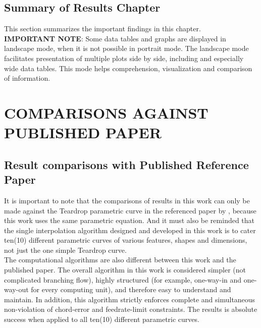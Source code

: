 \subsection{Summary of Results Chapter}
 
This section summarizes the important findings in this chapter.\\

\noindent
\textbf{IMPORTANT NOTE}: Some data tables and graphs are displayed in landscape mode, when it is not possible in portrait mode. The landscape mode facilitates presentation of multiple plots side by side, including and especially wide data tables. This mode helps comprehension, visualization and comparison of information.

\clearpage
\pagebreak

\section{COMPARISONS AGAINST PUBLISHED PAPER}

\subsection{Result comparisons with Published Reference Paper}

It is important to note that the comparisons of results in this work can only be made against the Teardrop parametric curve in the referenced paper by \cite{Zhong-etal:2018}, because this work uses the same parametric equation. And it must also be reminded that the single interpolation algorithm designed and developed in this work is to cater ten(10) different parametric curves of various features, shapes and dimensions, not just the one simple Teardrop curve. \\

The computational algorithms are also different between this work and the published paper. The overall algorithm in this work is considered simpler (not complicated branching flow), highly structured (for example, one-way-in and one-way-out for every computing unit), and therefore easy to understand and maintain. In addition, this algorithm strictly enforces complete and simultaneous non-violation of chord-error and feedrate-limit constraints. The results is absolute success when applied to all ten(10) different parametric curves. \\   

